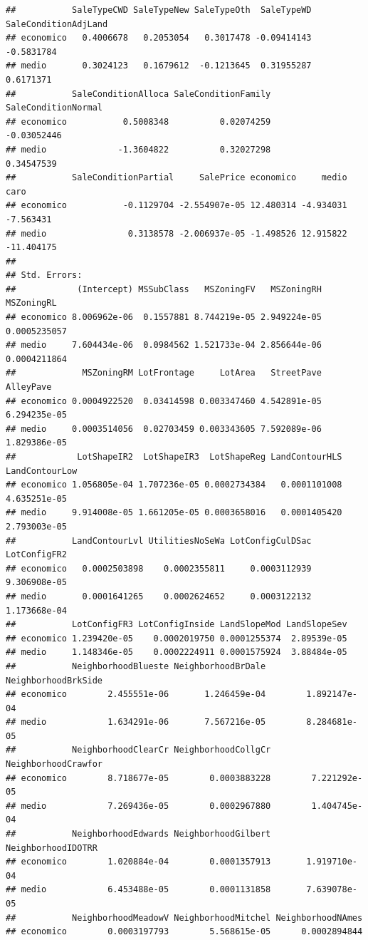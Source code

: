 \documentclass[
]{article}
\begin{document}
\begin{verbatim}
##           SaleTypeCWD SaleTypeNew SaleTypeOth  SaleTypeWD SaleConditionAdjLand
## economico   0.4006678   0.2053054   0.3017478 -0.09414143           -0.5831784
## medio       0.3024123   0.1679612  -0.1213645  0.31955287            0.6171371
##           SaleConditionAlloca SaleConditionFamily SaleConditionNormal
## economico           0.5008348          0.02074259         -0.03052446
## medio              -1.3604822          0.32027298          0.34547539
##           SaleConditionPartial     SalePrice economico     medio       caro
## economico           -0.1129704 -2.554907e-05 12.480314 -4.934031  -7.563431
## medio                0.3138578 -2.006937e-05 -1.498526 12.915822 -11.404175
## 
## Std. Errors:
##            (Intercept) MSSubClass   MSZoningFV   MSZoningRH   MSZoningRL
## economico 8.006962e-06  0.1557881 8.744219e-05 2.949224e-05 0.0005235057
## medio     7.604434e-06  0.0984562 1.521733e-04 2.856644e-06 0.0004211864
##             MSZoningRM LotFrontage     LotArea   StreetPave    AlleyPave
## economico 0.0004922520  0.03414598 0.003347460 4.542891e-05 6.294235e-05
## medio     0.0003514056  0.02703459 0.003343605 7.592089e-06 1.829386e-05
##            LotShapeIR2  LotShapeIR3  LotShapeReg LandContourHLS LandContourLow
## economico 1.056805e-04 1.707236e-05 0.0002734384   0.0001101008   4.635251e-05
## medio     9.914008e-05 1.661205e-05 0.0003658016   0.0001405420   2.793003e-05
##           LandContourLvl UtilitiesNoSeWa LotConfigCulDSac LotConfigFR2
## economico   0.0002503898    0.0002355811     0.0003112939 9.306908e-05
## medio       0.0001641265    0.0002624652     0.0003122132 1.173668e-04
##           LotConfigFR3 LotConfigInside LandSlopeMod LandSlopeSev
## economico 1.239420e-05    0.0002019750 0.0001255374  2.89539e-05
## medio     1.148346e-05    0.0002224911 0.0001575924  3.88484e-05
##           NeighborhoodBlueste NeighborhoodBrDale NeighborhoodBrkSide
## economico        2.455551e-06       1.246459e-04        1.892147e-04
## medio            1.634291e-06       7.567216e-05        8.284681e-05
##           NeighborhoodClearCr NeighborhoodCollgCr NeighborhoodCrawfor
## economico        8.718677e-05        0.0003883228        7.221292e-05
## medio            7.269436e-05        0.0002967880        1.404745e-04
##           NeighborhoodEdwards NeighborhoodGilbert NeighborhoodIDOTRR
## economico        1.020884e-04        0.0001357913       1.919710e-04
## medio            6.453488e-05        0.0001131858       7.639078e-05
##           NeighborhoodMeadowV NeighborhoodMitchel NeighborhoodNAmes
## economico        0.0003197793        5.568615e-05      0.0002894844

\end{verbatim}
\end{document}
